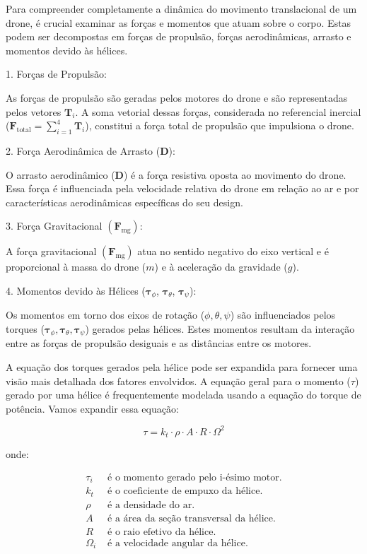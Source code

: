 Para compreender completamente a dinâmica do movimento translacional de um drone, é crucial examinar as forças e momentos que atuam sobre o corpo. Estas podem ser decompostas em forças de propulsão, forças aerodinâmicas, arrasto e momentos devido às hélices.

1. Forças de Propulsão:

As forças de propulsão são geradas pelos motores do drone e são representadas pelos vetores $\mathbf{T}_i$. A soma vetorial dessas forças, considerada no referencial inercial ($\mathbf{F}_{\text{total}} = \sum_{i=1}^{4} \mathbf{T}_i$), constitui a força total de propulsão que impulsiona o drone.

2. Força Aerodinâmica de Arrasto (\textbf{D}):

O arrasto aerodinâmico (\textbf{D}) é a força resistiva oposta ao movimento do drone. Essa força é influenciada pela velocidade relativa do drone em relação ao ar e por características aerodinâmicas específicas do seu design.

3. Força Gravitacional $(\textbf{F}_{\text{mg}})$:

A força gravitacional $(\textbf{F}_{\text{mg}})$ atua no sentido negativo do eixo vertical e é proporcional à massa do drone ($m$) e à aceleração da gravidade ($g$).

4. Momentos devido às Hélices ($\boldsymbol{\tau}_{\phi}$, $\boldsymbol{\tau}_{\theta}$, $\boldsymbol{\tau}_{\psi}$):

Os momentos em torno dos eixos de rotação ($\phi, \theta, \psi$) são influenciados pelos torques ($\boldsymbol{\tau}_{\phi}, \boldsymbol{\tau}_{\theta}, \boldsymbol{\tau}_{\psi}$) gerados pelas hélices. Estes momentos resultam da interação entre as forças de propulsão desiguais e as distâncias entre os motores.


A equação dos torques gerados pela hélice pode ser expandida para fornecer uma visão mais detalhada dos fatores envolvidos. A equação geral para o momento ($\tau$) gerado por uma hélice é frequentemente modelada usando a equação do torque de potência. Vamos expandir essa equação:

\begin{equation}
	\tau = k_t \cdot \rho \cdot A \cdot R \cdot \Omega^2
\end{equation}

onde:

\begin{align*}
	\tau_i   & \text{ é o momento gerado pelo i-ésimo motor.}   \\
	k_t      & \text{ é o coeficiente de empuxo da hélice.}     \\
	\rho     & \text{ é a densidade do ar.}                     \\
	A        & \text{ é a área da seção transversal da hélice.} \\
	R        & \text{ é o raio efetivo da hélice.}              \\
	\Omega_i & \text{ é a velocidade angular da hélice.}
\end{align*}

